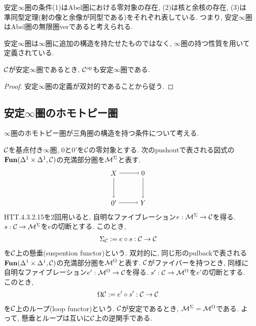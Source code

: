 \documentclass[uplatex, a4paper, 14Q, dvipdfmx]{jsarticle}
\begin{document}
\begin{remark}
  安定$\infty$圏の条件(1)はAbel圏における零対象の存在, (2)は核と余核の存在, (3)は準同型定理(射の像と余像が同型である)をそれぞれ表している. 
  つまり, 安定$\infty$圏はAbel圏の無限圏verであると考えられる. 
\end{remark}

\begin{remark}
  安定$\infty$圏は$\infty$圏に追加の構造を持たせたものではなく, $\infty$圏の持つ性質を用いて定義されている. 
\end{remark}

\begin{lemma} \label{prop:Cop_is_also_stable}
  $\mathcal{C}$が安定$\infty$圏であるとき, $\mathcal{C}^{\mathrm{op}}$も安定$\infty$圏である.
\end{lemma}

\begin{proof}
  安定$\infty$圏の定義が双対的であることから従う. 
\end{proof}


\subsection{安定\texorpdfstring{$\infty$}{infty}圏のホモトピー圏}

$\infty$圏のホモトピー圏が三角圏の構造を持つ条件について考える. 

$\mathcal{C}$を基点付き$\infty$圏, $0$と$0'$を$\mathcal{C}$の零対象とする. 
次のpushoutで表される図式の$\mathbf{Fun}(\Delta^1 \times \Delta^1,\mathcal{C})$の充満部分圏を$\mathcal{M}^\Sigma$と表す. 
\[
  \begin{tikzpicture}[auto,->]
    \node (0') at (0,0) {$0'$};
    \node (Y) at (1.5,0) {$Y$};
    \node (X) at (0,1.5) {$X$};
    \node (0) at (1.5,1.5) {$0$};
    \draw (X) -- (0);
    \draw (X) -- (0');
    \draw (0') -- (Y);
    \draw (0) -- (Y);
  \end{tikzpicture}
\]
HTT.4.3.2.15を2回用いると, 自明なファイブレーション$e : \mathcal{M}^\Sigma \to \mathcal{C}$を得る. 
$s : \mathcal{C} \to \mathcal{M}^\Sigma$を$e$の切断とする.
このとき, 
\begin{align*}
  \Sigma_{\mathcal{C}} := e \circ s : \mathcal{C} \to \mathcal{C}
\end{align*}
を$\mathcal{C}$上の懸垂(suspention functor)という. 
双対的に, 同じ形のpulbackで表される$\mathbf{Fun}(\Delta^1 \times \Delta^1,\mathcal{C})$の充満部分圏を$\mathcal{M}^\Omega$と表す. 
$\mathcal{C}$がファイバーを持つとき, 同様に自明なファイブレーション$e' : \mathcal{M}^\Omega \to \mathcal{C}$を得る. 
$s' : \mathcal{C} \to \mathcal{M}^\Omega$を$e'$の切断とする.
このとき, 
\begin{align*}
  \Omega\mathcal{C} := e' \circ s' : \mathcal{C} \to \mathcal{C}
\end{align*}
を$\mathcal{C}$上のループ(loop functor)という. 
$\mathcal{C}$が安定であるとき, $\mathcal{M}^\Sigma = \mathcal{M}^\Omega$である. 
よって, 懸垂とループは互いに$\mathcal{C}$上の逆関手である. 
\end{document}
